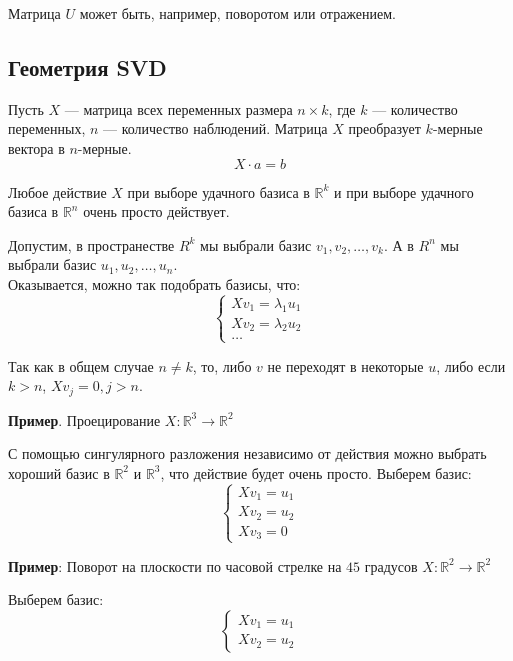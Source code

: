 \documentclass[12pt]{article} %
\theoremstyle{definition} %
\begin{document}
Матрица $U$ может быть, например, поворотом или отражением.

\subsection{Геометрия SVD}
Пусть $X$ — матрица всех переменных размера $n \times k$, где $k$ — количество переменных, $n$ — количество наблюдений.
Матрица $X$ преобразует $k$-мерные вектора в $n$-мерные.\\
\[X \cdot a = b\]

Любое действие $X$ при выборе удачного базиса в $\mathbb{R}^k$ и при выборе удачного базиса в $\mathbb{R}^n$ очень просто действует.

Допустим, в пространестве $R^k$ мы выбрали базис $v_1, v_2, \ldots, v_k$. А в $R^n$ мы выбрали базис $u_1, u_2, \ldots, u_n$.\\
Оказывается, можно так подобрать базисы, что:
\begin{equation*}
 \begin{cases}
   Xv_1=\lambda_1u_1
   \\
 Xv_2=\lambda_2u_2
 \\
 \ldots
 \end{cases}
\end{equation*}

Так как в общем случае $n \neq k$, то, либо $v$ не переходят в некоторые $u$, либо
если $k>n$, $Xv_j=0, j>n$.

\textbf{Пример}. Проецирование $X:\mathbb{R}^3 \rightarrow  \mathbb{R}^2$

С помощью сингулярного разложения независимо от действия можно выбрать хороший базис в $\mathbb{R} ^2$ и $\mathbb{R} ^3$, что действие будет очень просто. Выберем базис:
\begin{equation*}
 \begin{cases}
   Xv_1=u_1
   \\
 Xv_2=u_2
 \\
 Xv_3=0
 \end{cases}
\end{equation*}

\textbf{Пример}: Поворот на плоскости по часовой стрелке на $45$ градусов $X:\mathbb{R} ^2 \rightarrow  \mathbb{R} ^2$

Выберем базис:
\begin{equation*}
 \begin{cases}
   Xv_1=u_1
   \\
Xv_2=u_2
 \end{cases}
\end{equation*}
\end{document}
